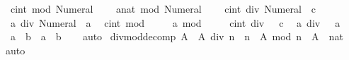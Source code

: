\begin{isabellebody}
\ \ {\isacartoucheopen}{\isacharparenleft}{\kern0pt}c{\isacharcolon}{\kern0pt}{\isacharcolon}{\kern0pt}int{\isacharparenright}{\kern0pt}\ mod\ Numeral{}\ {\isacharequal}{\kern0pt}\ {}{\isacartoucheclose}\isanewline
\ \ {\isacartoucheopen}{\isacharparenleft}{\kern0pt}a{\isacharcolon}{\kern0pt}{\isacharcolon}{\kern0pt}nat{\isacharparenright}{\kern0pt}\ mod\ Numeral{}\ {\isacharequal}{\kern0pt}\ {}{\isacartoucheclose}\isanewline
\ \ {\isacartoucheopen}{\isacharparenleft}{\kern0pt}c{\isacharcolon}{\kern0pt}{\isacharcolon}{\kern0pt}int{\isacharparenright}{\kern0pt}\ div\ Numeral{}\ {\isacharequal}{\kern0pt}\ c{\isacartoucheclose}\isanewline
\ \ {\isacartoucheopen}a\ div\ Numeral{}\ {\isacharequal}{\kern0pt}\ a{\isacartoucheclose}\isanewline
\ \ {\isacartoucheopen}{\isacharparenleft}{\kern0pt}c{\isacharcolon}{\kern0pt}{\isacharcolon}{\kern0pt}int{\isacharparenright}{\kern0pt}\ mod\ {}\ {\isacharequal}{\kern0pt}\ {}{\isacartoucheclose}\isanewline
\ \ {\isacartoucheopen}a\ mod\ {}\ {\isacharequal}{\kern0pt}\ {}{\isacartoucheclose}\isanewline
\ \ {\isacartoucheopen}{\isacharparenleft}{\kern0pt}c{\isacharcolon}{\kern0pt}{\isacharcolon}{\kern0pt}int{\isacharparenright}{\kern0pt}\ div\ {}\ {\isacharequal}{\kern0pt}\ c{\isacartoucheclose}\isanewline
\ \ {\isacartoucheopen}a\ div\ {}\ {\isacharequal}{\kern0pt}\ a{\isacartoucheclose}\isanewline
\ \ {\isacartoucheopen}{\isasymnot}{\isacharparenleft}{\kern0pt}a{\isacharprime}{\kern0pt}\ {\isasymnoteq}\ b{\isacharprime}{\kern0pt}{\isacharparenright}{\kern0pt}\ {\isasymlongleftrightarrow}\ a{\isacharprime}{\kern0pt}\ {\isacharequal}{\kern0pt}\ b{\isacharprime}{\kern0pt}{\isacartoucheclose}\isanewline
%
\isadelimproof
\ \ %
\endisadelimproof
%
\isatagproof
{}\isamarkupfalse%
\ auto%
\endisatagproof
{\isafoldproof}%
%
\isadelimproof
\isanewline
%
\endisadelimproof
\isanewline
\isanewline
{}\isamarkupfalse%
\ div{\isacharunderscore}{\kern0pt}mod{\isacharunderscore}{\kern0pt}decomp{\isacharcolon}{\kern0pt}\ {\isachardoublequoteopen}A\ {\isacharequal}{\kern0pt}\ {\isacharparenleft}{\kern0pt}A\ div\ n{\isacharparenright}{\kern0pt}\ {\isacharasterisk}{\kern0pt}\ n\ {\isacharplus}{\kern0pt}\ {\isacharparenleft}{\kern0pt}A\ mod\ n{\isacharparenright}{\kern0pt}{\isachardoublequoteclose}\ \ A\ {\isacharcolon}{\kern0pt}{\isacharcolon}{\kern0pt}\ nat\isanewline
%
\isadelimproof
\ \ %
\endisadelimproof
%
\isatagproof
{}\isamarkupfalse%
\ auto%

\end{isabellebody}
